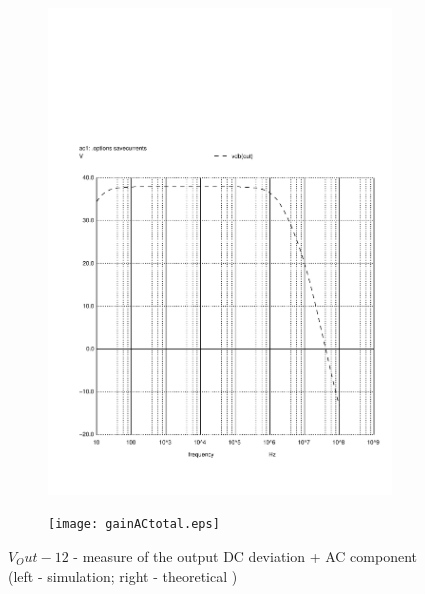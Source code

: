 \begin{figure}[h]
    \centering
    \begin{subfigure}{0.23\textwidth}
        \includegraphics[width=\linewidth, clip]{vo2f.pdf}
        \label{fig:output1}
    \end{subfigure}
    \begin{subfigure}{0.23\textwidth}
        \texttt{[image: gainACtotal.eps]}
        \label{fig:output2}
    \end{subfigure}
    \caption{\small $V_Out - 12$ - measure of the output DC deviation + AC component (left - simulation; right - theoretical )}
    \label{output_deviation}
\end{figure}



